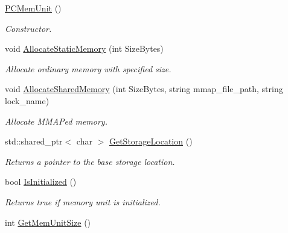 \begin{DoxyCompactItemize}
\item 
\hyperlink{classpc__emulator_1_1PCMemUnit_a13340ee696d0d3f5b6858791b64a9de5}{P\+C\+Mem\+Unit} ()\hypertarget{classpc__emulator_1_1PCMemUnit_a13340ee696d0d3f5b6858791b64a9de5}{}\label{classpc__emulator_1_1PCMemUnit_a13340ee696d0d3f5b6858791b64a9de5}

\begin{DoxyCompactList}\small\item\em Constructor. \end{DoxyCompactList}\item 
void \hyperlink{classpc__emulator_1_1PCMemUnit_ab061a73c8934d7a7796db28f26c32989}{Allocate\+Static\+Memory} (int Size\+Bytes)\hypertarget{classpc__emulator_1_1PCMemUnit_ab061a73c8934d7a7796db28f26c32989}{}\label{classpc__emulator_1_1PCMemUnit_ab061a73c8934d7a7796db28f26c32989}

\begin{DoxyCompactList}\small\item\em Allocate ordinary memory with specified size. \end{DoxyCompactList}\item 
void \hyperlink{classpc__emulator_1_1PCMemUnit_a35f27d5bb1922e0611211c5031ab9d83}{Allocate\+Shared\+Memory} (int Size\+Bytes, string mmap\+\_\+file\+\_\+path, string lock\+\_\+name)
\begin{DoxyCompactList}\small\item\em Allocate M\+M\+AP\textquotesingle{}ed memory. \end{DoxyCompactList}\item 
std\+::shared\+\_\+ptr$<$ char $>$ \hyperlink{classpc__emulator_1_1PCMemUnit_af562a3bf682d124185d12ccc476d4aa5}{Get\+Storage\+Location} ()\hypertarget{classpc__emulator_1_1PCMemUnit_af562a3bf682d124185d12ccc476d4aa5}{}\label{classpc__emulator_1_1PCMemUnit_af562a3bf682d124185d12ccc476d4aa5}

\begin{DoxyCompactList}\small\item\em Returns a pointer to the base storage location. \end{DoxyCompactList}\item 
bool \hyperlink{classpc__emulator_1_1PCMemUnit_af0169bf026478f72e04c62f92979a6d6}{Is\+Initialized} ()\hypertarget{classpc__emulator_1_1PCMemUnit_af0169bf026478f72e04c62f92979a6d6}{}\label{classpc__emulator_1_1PCMemUnit_af0169bf026478f72e04c62f92979a6d6}

\begin{DoxyCompactList}\small\item\em Returns true if memory unit is initialized. \end{DoxyCompactList}\item 
int \hyperlink{classpc__emulator_1_1PCMemUnit_aa4db563b6e4e2d642d322bbc4167f006}{Get\+Mem\+Unit\+Size} ()\hypertarget{classpc__emulator_1_1PCMemUnit_aa4db563b6e4e2d642d322bbc4167f006}{}\label{classpc__emulator_1_1PCMemUnit_aa4db563b6e4e2d642d322bbc4167f006}


\end{DoxyCompactItemize}
